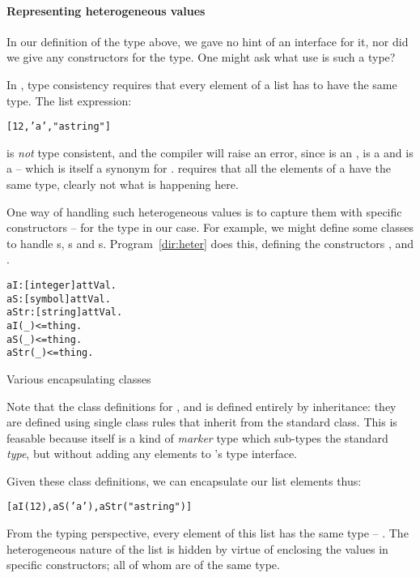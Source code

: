 \paragraph{Representing heterogeneous values}
In our definition of the  type above, we gave no hint of an interface for it, nor did we give any constructors for the type. One might ask what use is such a type?

In \go, type consistency requires that every element of a list has to have the same type. The list expression:
\begin{alltt}
[12,'a',"a string"]
\end{alltt}
is \emph{not} type consistent, and the \go compiler will raise an error, since  is an ,  is a  and  is a  -- which is itself a synonym for . \go requires that all the elements of a  have the same type, clearly not what is happening here.

One way of handling such heterogeneous values is to capture them with specific constructors -- for the  type in our case. For example, we might define some classes to handle s, s and s. Program~\vref{dir:heter} does this, defining the constructors ,  and .
\begin{program}[b]
\vspace{0.5ex}
\begin{alltt}
aI:[integer]\conarrow{}attVal.
aS:[symbol]\conarrow{}attVal.
aStr:[string]\conarrow{}attVal.
aI(_)<=thing.
aS(_)<=thing.
aStr(_)<=thing.
\end{alltt}
\vspace{-2ex}
\caption{Various encapsulating classes}
\label{dir:heter}
\end{program}
\begin{aside}
Note that the class definitions for ,  and  is defined entirely by inheritance: they are defined using single class rules that inherit from the standard  class. This is feasable because  itself is a kind of \emph{marker} type which sub-types the standard  \emph{type}, but without adding any elements to 's type interface. 
\end{aside}

Given these class definitions, we can encapsulate our list elements thus:
\begin{alltt}
[aI(12),aS('a'),aStr("a string")]
\end{alltt}
From the typing perspective, every element of this list has the same type -- . The heterogeneous nature of the list is hidden by virtue of enclosing the values in specific constructors; all of whom are of the same  type.

